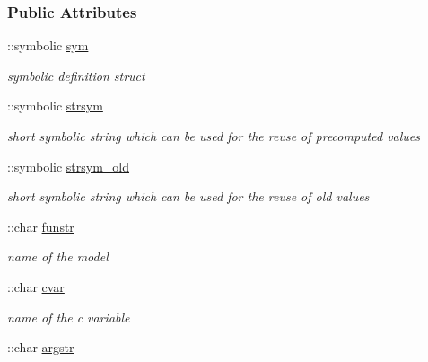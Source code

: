 \subsubsection*{Public Attributes}
\begin{DoxyCompactItemize}
\item 
\hypertarget{classamifun_a3c48fff3d28406486a4f1b5e18da7ca6}{}\+::symbolic \hyperlink{classamifun_a3c48fff3d28406486a4f1b5e18da7ca6}{sym}\label{classamifun_a3c48fff3d28406486a4f1b5e18da7ca6}

\begin{DoxyCompactList}\small\item\em symbolic definition struct \end{DoxyCompactList}\item 
\hypertarget{classamifun_a4814315a739f43461b003c1c1ef6f550}{}\+::symbolic \hyperlink{classamifun_a4814315a739f43461b003c1c1ef6f550}{strsym}\label{classamifun_a4814315a739f43461b003c1c1ef6f550}

\begin{DoxyCompactList}\small\item\em short symbolic string which can be used for the reuse of precomputed values \end{DoxyCompactList}\item 
\hypertarget{classamifun_ac42759baa6575c9d39f487be5a2e01a1}{}\+::symbolic \hyperlink{classamifun_ac42759baa6575c9d39f487be5a2e01a1}{strsym\+\_\+old}\label{classamifun_ac42759baa6575c9d39f487be5a2e01a1}

\begin{DoxyCompactList}\small\item\em short symbolic string which can be used for the reuse of old values \end{DoxyCompactList}\item 
\hypertarget{classamifun_a484b54379bc8b29b6ce65d84966ea4c4}{}\+::char \hyperlink{classamifun_a484b54379bc8b29b6ce65d84966ea4c4}{funstr}\label{classamifun_a484b54379bc8b29b6ce65d84966ea4c4}

\begin{DoxyCompactList}\small\item\em name of the model \end{DoxyCompactList}\item 
\hypertarget{classamifun_a716c1ceb8235bc1005b606f777530ede}{}\+::char \hyperlink{classamifun_a716c1ceb8235bc1005b606f777530ede}{cvar}\label{classamifun_a716c1ceb8235bc1005b606f777530ede}

\begin{DoxyCompactList}\small\item\em name of the c variable \end{DoxyCompactList}\item 
\hypertarget{classamifun_aa3914760f4131288b95f0f23d0fdfa6d}{}\+::char \hyperlink{classamifun_aa3914760f4131288b95f0f23d0fdfa6d}{argstr}\label{classamifun_aa3914760f4131288b95f0f23d0fdfa6d}


\end{DoxyCompactItemize}

